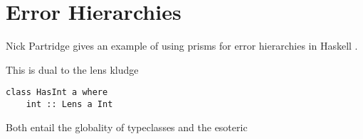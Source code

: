 \documentclass{article}
\begin{document}


\section{Error Hierarchies}

Nick Partridge gives an example of using prisms for error hierarchies in Haskell \cite{errorprisms}.

This is dual to the lens kludge

\begin{verbatim}
class HasInt a where
    int :: Lens a Int
\end{verbatim}


Both entail the globality of typeclasses and the esoteric
\end{document}
